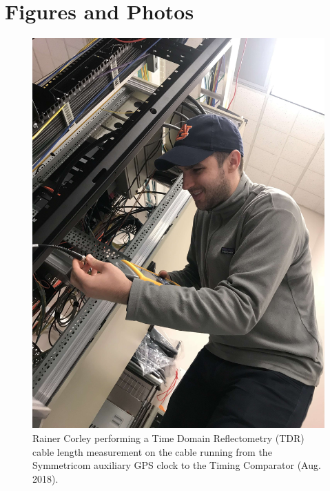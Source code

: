 \documentclass{article}
\begin{document}
\section{Figures and Photos}
\label{sec:figures}
\begin{figure}[!htb]
	\begin{center}
		\includegraphics[width=0.8\linewidth]{img/rainer-performing-tdr.jpg}
	\end{center}
	\caption{Rainer Corley performing a Time Domain Reflectometry (TDR) cable length measurement on the cable running from the Symmetricom auxiliary GPS clock to the Timing Comparator (Aug. 2018).}
	\label{fig:rainertdr}
\end{figure}
\end{document}
